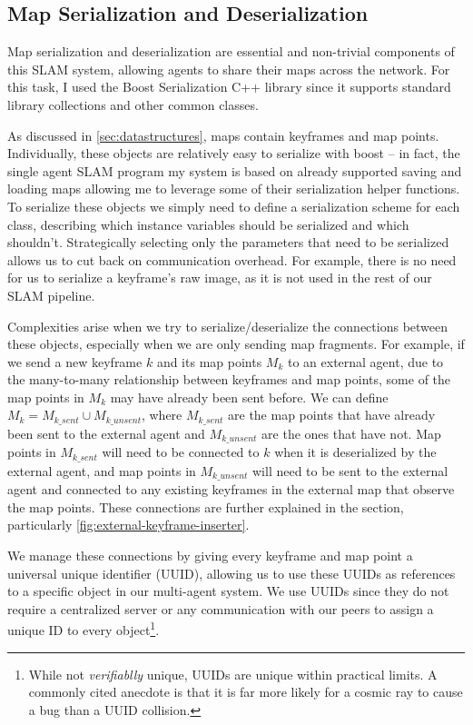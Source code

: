 \subsection{Map Serialization and Deserialization}
\label{sec:map-serialization-and-deserialization}
Map serialization and deserialization are essential and non-trivial components of this SLAM system, allowing agents to share their maps across the network. For this task, I used the Boost \autocite{boostLibrary} Serialization C++ library since it supports standard library collections and other common classes.

As discussed in \autoref{sec:datastructures}, maps contain keyframes and map points. Individually, these objects are relatively easy to serialize with boost – in fact, the single agent SLAM program my system is based on already supported saving and loading maps allowing me to leverage some of their serialization helper functions. To serialize these objects we simply need to define a serialization scheme for each class, describing which instance variables should be serialized and which shouldn't. Strategically selecting only the parameters that need to be serialized allows us to cut back on communication overhead. For example, there is no need for us to serialize a keyframe's raw image, as it is not used in the rest of our SLAM pipeline.

Complexities arise when we try to serialize/deserialize the connections between these objects, especially when we are only sending map fragments. For example, if we send a new keyframe $k$ and its map points $M_k$ to an external agent, due to the many-to-many relationship between keyframes and map points, some of the map points in $M_k$ may have already been sent before. We can define $M_k = M_{k\_sent} \cup M_{k\_unsent}$, where $M_{k\_sent}$ are the map points that have already been sent to the external agent and $M_{k\_unsent}$ are the ones that have not. Map points in $M_{k\_sent}$ will need to be connected to $k$ when it is deserialized by the external agent, and map points in $M_{k\_unsent}$ will need to be sent to the external agent and connected to any existing keyframes in the external map that observe the map points. These connections are further explained in the  section, particularly \autoref{fig:external-keyframe-inserter}.

We manage these connections by giving every keyframe and map point a universal unique identifier (UUID), allowing us to use these UUIDs as references to a specific object in our multi-agent system. We use UUIDs since they do not require a centralized server or any communication with our peers to assign a unique ID to every object\footnote[1]{While not \textit{verifiablly} unique, UUIDs are unique within practical limits. A commonly cited anecdote is that it is far more likely for a cosmic ray to cause a bug than a UUID collision.}.

